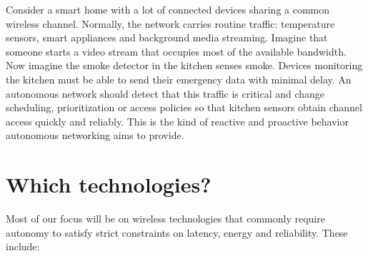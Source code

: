 Consider a smart home with a lot of connected devices sharing a common wireless channel. Normally, the network carries routine traffic: temperature sensors, smart appliances and background media streaming. Imagine that someone starts a video stream that occupies most of the available bandwidth. Now imagine the smoke detector in the kitchen senses smoke. Devices monitoring the kitchen must be able to send their emergency data with minimal delay. An autonomous network should detect that this traffic is critical and change scheduling, prioritization or access policies so that kitchen sensors obtain channel access quickly and reliably. This is the kind of reactive and proactive behavior autonomous networking aims to provide.

\section{Which technologies?}
Most of our focus will be on wireless technologies that commonly require autonomy to satisfy strict constraints on latency, energy and reliability. These include:
